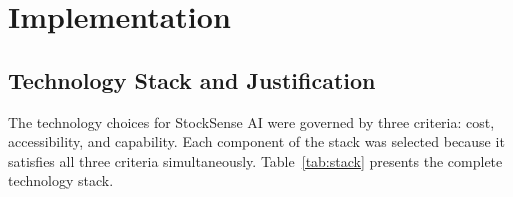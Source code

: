 \chapter{Implementation}
\label{ch:impl}

\section{Technology Stack and Justification}

The technology choices for StockSense AI were governed by three criteria: cost, accessibility,
and capability. Each component of the stack was selected because it satisfies all three criteria
simultaneously. Table~\ref{tab:stack} presents the complete technology stack.

